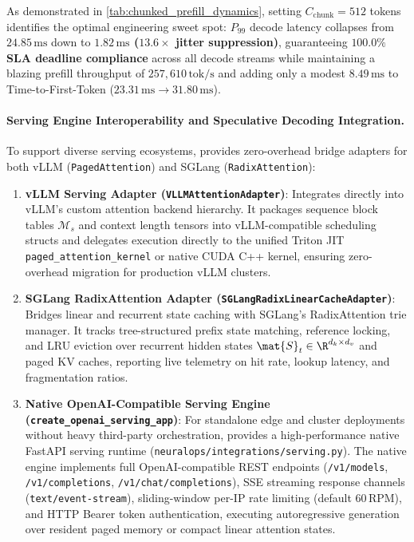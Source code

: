 As demonstrated in \cref{tab:chunked_prefill_dynamics}, setting $C_{\text{chunk}} = 512$ tokens identifies the optimal engineering sweet spot: $P_{99}$ decode latency collapses from $24.85\,\text{ms}$ down to \textbf{$1.82\,\text{ms}$ ($13.6\times$ jitter suppression)}, guaranteeing \textbf{$100.0\%$ SLA deadline compliance} across all decode streams while maintaining a blazing prefill throughput of $257{,}610\,\text{tok/s}$ and adding only a modest $8.49\,\text{ms}$ to Time-to-First-Token ($23.31\,\text{ms} \to 31.80\,\text{ms}$).

\paragraph{Serving Engine Interoperability and Speculative Decoding Integration.}
To support diverse serving ecosystems, \neuralops{} provides zero-overhead bridge adapters for both vLLM (\texttt{PagedAttention}) and SGLang (\texttt{RadixAttention}):
\begin{enumerate}
    \item \textbf{vLLM Serving Adapter (\texttt{VLLMAttentionAdapter})}: Integrates directly into vLLM's custom attention backend hierarchy. It packages sequence block tables $\mathcal{M}_s$ and context length tensors into vLLM-compatible scheduling structs and delegates execution directly to the unified Triton JIT \texttt{paged\_attention\_kernel} or native CUDA C++ kernel, ensuring zero-overhead migration for production vLLM clusters.
    \item \textbf{SGLang RadixAttention Adapter (\texttt{SGLangRadixLinearCacheAdapter})}: Bridges linear and recurrent state caching with SGLang's RadixAttention trie manager. It tracks tree-structured prefix state matching, reference locking, and LRU eviction over recurrent hidden states $\mat{S}_t \in \R^{d_k \times d_v}$ and paged KV caches, reporting live telemetry on hit rate, lookup latency, and fragmentation ratios.
    \item \textbf{Native OpenAI-Compatible Serving Engine (\texttt{create\_openai\_serving\_app})}: For standalone edge and cluster deployments without heavy third-party orchestration, \neuralops{} provides a high-performance native FastAPI serving runtime (\texttt{neuralops/integrations/serving.py}). The native engine implements full OpenAI-compatible REST endpoints (\texttt{/v1/models}, \texttt{/v1/completions}, \texttt{/v1/chat/completions}), SSE streaming response channels (\texttt{text/event-stream}), sliding-window per-IP rate limiting (default $60\,\text{RPM}$), and HTTP Bearer token authentication, executing autoregressive generation over resident paged memory or compact linear attention states.
\end{enumerate}

